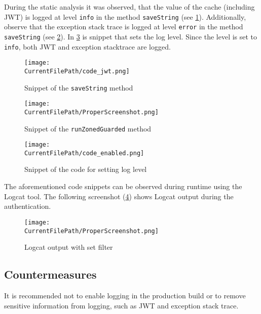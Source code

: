 During the static analysis it was observed, that the value of the cache (including JWT) is logged at level \texttt{info} in the method \texttt{saveString} (see \cref{figure:code_jwt}).
Additionally, observe that the exception stack trace is logged at level \texttt{error} in the method \texttt{saveString} (see \cref{figure:code_exception}).
In \cref{figure:code_enabled} is snippet that sets the log level.
Since the level is set to \texttt{info}, both JWT  and exception stacktrace are logged.

\begin{figure}[H]
\centering
\texttt{[image: \\CurrentFilePath/code\_jwt.png]}
\caption{Snippet of the \texttt{saveString} method}
\label{figure:code_jwt}
\end{figure}

\begin{figure}[H]
\centering
\texttt{[image: \\CurrentFilePath/ProperScreenshot.png]}
\caption{Snippet of the \texttt{runZonedGuarded} method}
\label{figure:code_exception}
\end{figure}

\begin{figure}[H]
\centering
\texttt{[image: \\CurrentFilePath/code\_enabled.png]}
\caption{Snippet of the code for setting log level}
\label{figure:code_enabled}
\end{figure}

The aforementioned code snippets can be observed during runtime using the Logcat tool. 
The following screenshot (\cref{figure:logcat}) shows Logcat output during the authentication.

\begin{figure}[H]
\centering
\texttt{[image: \\CurrentFilePath/ProperScreenshot.png]}
\caption{Logcat output with set filter}
\label{figure:logcat}
\end{figure}


\subsection*{Countermeasures}

It is recommended not to enable logging in the production build or to remove sensitive information from logging, such as JWT and exception stack trace.

